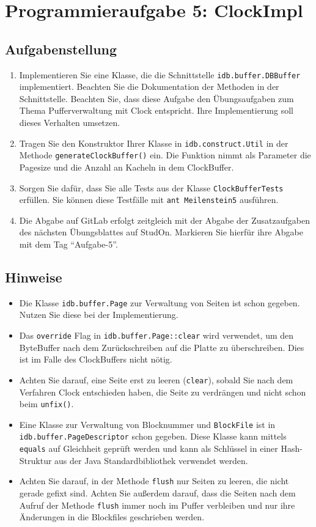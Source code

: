 \section{Programmieraufgabe 5: ClockImpl}

\subsection{Aufgabenstellung}
\begin{enumerate}
	\item Implementieren Sie eine Klasse, die die Schnittstelle \beamertxt{\linebreak}\texttt{idb.buffer.DBBuffer} implementiert.
		Beachten Sie die Dokumentation der Methoden in der Schnittstelle. Beachten Sie, dass diese Aufgabe den Übungsaufgaben zum Thema Pufferverwaltung mit Clock entspricht.
		Ihre Implementierung soll dieses Verhalten umsetzen.
	\item Tragen Sie den Konstruktor Ihrer Klasse in \texttt{idb.construct.Util} in der Methode \texttt{generateClockBuffer()} ein.
		Die Funktion nimmt als Parameter die Pagesize und die Anzahl an Kacheln in dem ClockBuffer.
	\item Sorgen Sie dafür, dass Sie alle Tests aus der Klasse \texttt{ClockBufferTests} erfüllen.
	Sie können diese Testfälle mit \lstinline|ant Meilenstein5| ausführen.
	\item Die Abgabe auf GitLab erfolgt zeitgleich mit der Abgabe der Zusatzaufgaben des nächsten Übungsblattes auf StudOn. Markieren Sie hierfür ihre Abgabe mit dem Tag "`Aufgabe-5"'.
\end{enumerate}

\subsection{Hinweise}
\begin{itemize}
	\item Die Klasse \texttt{idb.buffer.Page} zur Verwaltung von Seiten ist schon gegeben. Nutzen Sie diese bei der Implementierung.
	\item Das \texttt{override} Flag in \texttt{idb.buffer.Page::clear} wird verwendet, um den ByteBuffer nach dem Zurückschreiben auf die Platte zu überschreiben.
		Dies ist im Falle des ClockBuffers nicht nötig.
	\item Achten Sie darauf, eine Seite erst zu leeren (\texttt{clear}), sobald Sie nach dem Verfahren Clock entschieden haben, die Seite zu verdrängen und nicht schon beim \texttt{unfix()}.
	\item Eine Klasse zur Verwaltung von Blocknummer und \texttt{BlockFile} ist in \texttt{idb.buffer.PageDescriptor} schon gegeben. Diese Klasse kann mittels \texttt{equals} auf Gleichheit geprüft werden und kann als Schlüssel in einer Hash-Struktur aus der Java Standardbibliothek verwendet werden.
	\item Achten Sie darauf, in der Methode \texttt{flush} nur Seiten zu leeren, die nicht gerade gefixt sind. Achten Sie außerdem darauf, dass die Seiten nach dem Aufruf der Methode \texttt{flush} immer noch im Puffer verbleiben und nur ihre Änderungen in die Blockfiles geschrieben werden.
\end{itemize}
